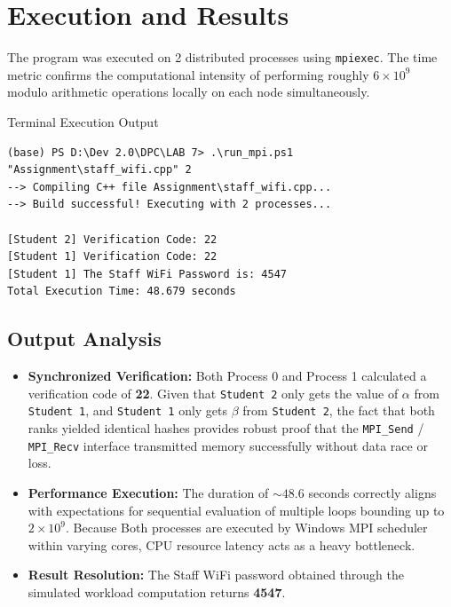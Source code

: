 \documentclass[11pt]{article}
\begin{document}
\section{Execution and Results}

The program was executed on 2 distributed processes using \texttt{mpiexec}. The time metric confirms the computational intensity of performing roughly $6 \times 10^9$ modulo arithmetic operations locally on each node simultaneously. 

\begin{terminalbox}{Terminal Execution Output}
\begin{lstlisting}[style=terminalstyle]
(base) PS D:\Dev 2.0\DPC\LAB 7> .\run_mpi.ps1 "Assignment\staff_wifi.cpp" 2
--> Compiling C++ file Assignment\staff_wifi.cpp...
--> Build successful! Executing with 2 processes...

[Student 2] Verification Code: 22
[Student 1] Verification Code: 22
[Student 1] The Staff WiFi Password is: 4547
Total Execution Time: 48.679 seconds
\end{lstlisting}
\end{terminalbox}

\subsection{Output Analysis}
\begin{itemize}
    \item \textbf{Synchronized Verification:} Both Process 0 and Process 1 calculated a verification code of \textbf{22}. Given that \texttt{Student 2} only gets the value of $\alpha$ from \texttt{Student 1}, and \texttt{Student 1} only gets $\beta$ from \texttt{Student 2}, the fact that both ranks yielded identical hashes provides robust proof that the \texttt{MPI\_Send} / \texttt{MPI\_Recv} interface transmitted memory successfully without data race or loss.
    \item \textbf{Performance Execution:} The duration of $\sim 48.6$ seconds correctly aligns with expectations for sequential evaluation of multiple loops bounding up to $2 \times 10^9$. Because Both processes are executed by Windows MPI scheduler within varying cores, CPU resource latency acts as a heavy bottleneck.
    \item \textbf{Result Resolution:} The Staff WiFi password obtained through the simulated workload computation returns \textbf{4547}.
\end{itemize}
\end{document}

